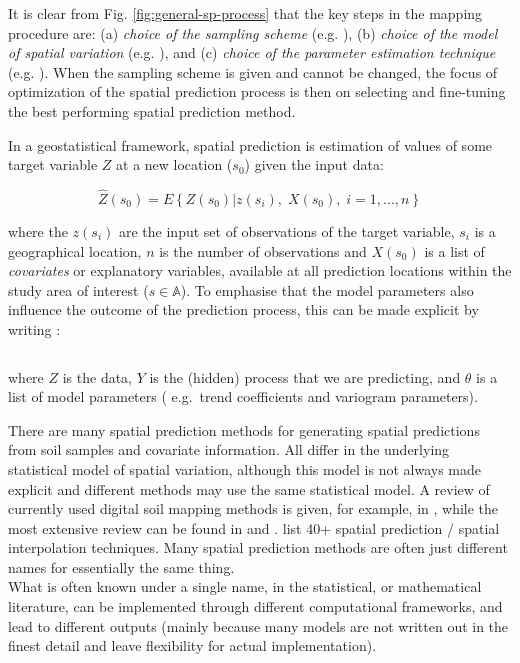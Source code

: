 \documentclass[graybox,natbib,nospthms,UStrade]{svmono}
\begin{document}
It is clear from Fig. \ref{fig:general-sp-process} that
the key steps in the mapping procedure are: (a) \emph{choice of the sampling scheme} (e.g. \citet{Ng2018}),
(b) \emph{choice of the model of spatial variation} (e.g. \citet{Diggle2007Springer}), and
(c) \emph{choice of the parameter estimation technique} (e.g. \citet{lark2006spatial}). When the sampling scheme is
given and cannot be changed, the focus of optimization of the spatial
prediction process is then on selecting and fine-tuning the best
performing spatial prediction method.

In a geostatistical framework, spatial prediction is estimation of
values of some target variable \(Z\) at a new location (\({s}_0\))
given the input data:

\begin{equation}
\hat Z({s}_0) = E\left\{ Z({s}_0)|z({s}_i), \; {{X}}({s}_0), \; i=1,...,n \right\}
\label{eq:sp}
\end{equation}

where the \(z({s}_i)\) are the input set of observations of the
target variable, \({s}_i\) is a geographical location, \(n\) is the
number of observations and \({{X}}({s}_0)\) is a list of
\emph{covariates} or explanatory variables, available at all prediction
locations within the study area of interest (\({s} \in \mathbb{A}\)).
To emphasise that the model parameters also influence the outcome of the
prediction process, this can be made explicit by writing
\citep{cressie2011statistics}:

\begin{equation}
[Z|Y,{{\theta}} ]
\label{eq:datamodel}
\end{equation}

where \(Z\) is the data, \(Y\) is the (hidden) process that we are
predicting, and \({{\theta}}\) is a list of model parameters (
e.g.~trend coefficients and variogram parameters).

There are many spatial prediction methods for generating spatial
predictions from soil samples and covariate information. All differ in
the underlying statistical model of spatial variation, although this
model is not always made explicit and different methods may use the same
statistical model. A review of currently used digital soil mapping
methods is given, for example, in \citet{McBratney2011HSS}, while the most
extensive review can be found in \citet{McBratney2003Geoderma} and \citet{mcbratney2018pedometrics}. \citet{LiHeap2010EI} list 40+ spatial prediction / spatial interpolation
techniques. Many spatial prediction methods are often
just different names for essentially the same thing.\\
What is often known under a single name, in the statistical,
or mathematical literature, can be implemented through
different computational frameworks, and lead to different outputs
(mainly because many models are not written out in the finest detail and leave
flexibility for actual implementation).
\end{document}
